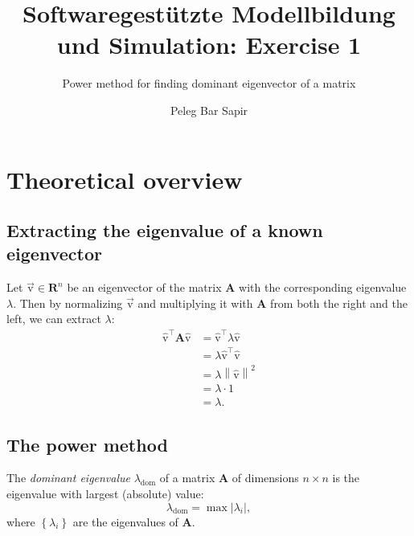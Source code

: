 \documentclass[12pt]{scrartcl}
\title{Softwaregestützte Modellbildung und Simulation: Exercise 1}
\subtitle{Power method for finding dominant eigenvector of a matrix}
\author{Peleg Bar Sapir}
\newcommand{\mtrx}[1]{\mathbf{#1}}
\newcommand{\vvec}[1]{\vec{\mathrm{#1}}}
\newcommand{\uvec}[1]{\hat{\mathrm{#1}}}
\newcommand{\T}[1]{#1^{\intercal}}
\begin{document}
\maketitle

\section{Theoretical overview}
\subsection{Extracting the eigenvalue of a known eigenvector}
Let $\vvec{v}\in\mathbf{R}^{n}$ be an eigenvector of the matrix $\mtrx{A}$ with the corresponding eigenvalue $\lambda$. Then by normalizing $\vvec{v}$ and multiplying it with $\mtrx{A}$ from both the right and the left, we can extract $\lambda$:
\begin{equation}
    \begin{aligned}
        \T{\uvec{v}}\mtrx{A}\uvec{v} &= \T{\uvec{v}}\lambda\uvec{v}\\
                                     &= \lambda\T{\uvec{v}}\uvec{v}\\
                                     &= \lambda\left\|\uvec{v}\right\|^{2}\\
                                     &= \lambda\cdot1\\
                                     &= \lambda.
    \end{aligned}
    \label{eq:eigenval_from_vec}
\end{equation}

\subsection{The power method}
The \textit{dominant eigenvalue} $\lambda_{\mathrm{dom}}$ of a matrix $\mtrx{A}$ of dimensions $n\times n$ is the eigenvalue with largest (absolute) value:
\begin{equation}
    \lambda_{\mathrm{dom}} = \max\left|\lambda_{i}\right|,
    \label{eq:}
\end{equation}
where $\left\{\lambda_{i}\right\}$ are the eigenvalues of $\mtrx{A}$.
\end{document}
